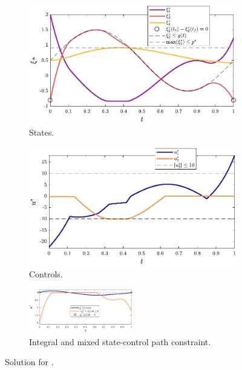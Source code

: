 \begin{figure}
\centering

\begin{subfigure}{0.5\textwidth}
\centering
\includegraphics[width=\textwidth]{../ch5/figures/ex5sol-states}%
\caption{States.}
\label{fig:ch5:ex5sol:states}
\end{subfigure}%
\begin{subfigure}{0.5\textwidth}
\centering
\includegraphics[width=\textwidth]{../ch5/figures/ex5sol-controls}%
\caption{Controls.}
\label{fig:ch5:ex5sol:controls}
\end{subfigure}%

\begin{subfigure}{\textwidth}
\centering
\includegraphics[width=0.5\textwidth]{../ch5/figures/ex5sol-other}%
\caption{Integral and mixed state-control path constraint.}
\label{fig:ch5:ex5sol:other}
\end{subfigure}%

\caption{Solution for .}
\label{fig:ch5:ex5sens}
\end{figure}